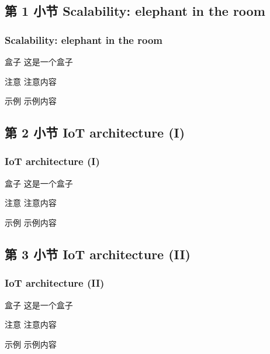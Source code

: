 \documentclass[
    aspectratio=169,                   %
]{beamer}
\begin{document}
\subsection{第 1 小节 Scalability: elephant in the room}

    \begin{frame}
        \frametitle{Scalability: elephant in the room}
        
        \begin{block}{盒子}
            这是一个盒子\cite{conoscenti}
        \end{block}

        \begin{alertblock}{注意}
            注意内容
        \end{alertblock}

        \begin{exampleblock}{示例}
            示例内容
        \end{exampleblock}
    \end{frame}

\subsection{第 2 小节 IoT architecture (I)}

    \begin{frame}
        \frametitle{IoT architecture (I)}
        
        \begin{block}{盒子}
            这是一个盒子\cite{novo}
        \end{block}

        \begin{alertblock}{注意}
            注意内容
        \end{alertblock}

        \begin{exampleblock}{示例}
            示例内容
        \end{exampleblock}
    \end{frame}

\subsection{第 3 小节 IoT architecture (II)}

    \begin{frame}
        \frametitle{IoT architecture (II)}
        
        \begin{block}{盒子}
            这是一个盒子\cite{ouaddah}
        \end{block}

        \begin{alertblock}{注意}
            注意内容
        \end{alertblock}

        \begin{exampleblock}{示例}
            示例内容
        \end{exampleblock}
    \end{frame}
\end{document}
